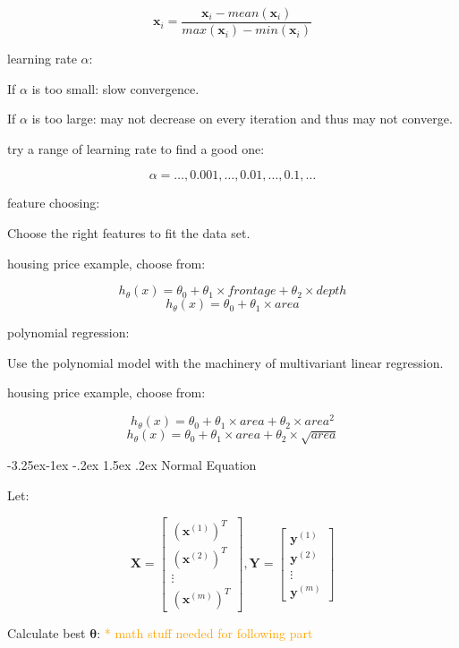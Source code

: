 \documentclass{article}
\makeatletter
\renewcommand\paragraph{\@startsection{paragraph}{4}{\z@}%
                                     {-3.25ex\@plus -1ex \@minus -.2ex}%
                                     {1.5ex \@plus .2ex}%
                                     {\normalfont\normalsize\bfseries}}
\makeatother
\begin{document}
\[\textbf{x}_i = \frac{\textbf{x}_i - mean(\textbf{x}_i)}{max(\textbf{x}_i) - min(\textbf{x}_i)}\]

\noindent learning rate \(\alpha\):

\noindent If \(\alpha\) is too small: slow convergence.

\noindent If \(\alpha\) is too large: may not decrease on every iteration and thus may not converge.

\noindent try a range of learning rate to find a good one:

\[\alpha = \dots, 0.001, \dots, 0.01, \dots, 0.1, \dots\]

\noindent feature choosing:

\noindent Choose the right features to fit the data set.

\noindent housing price example, choose from:

\[h_{\theta}(x) = \theta_0 + \theta_1 \times frontage + \theta_2 \times depth\]
\[h_{\theta}(x) = \theta_0 + \theta_1 \times area\]

\noindent polynomial regression:

\noindent Use the polynomial model with the machinery of multivariant linear regression.

\noindent housing price example, choose from:

\[h_{\theta}(x) = \theta_0 + \theta_1 \times area + \theta_2 \times area^2\]
\[h_{\theta}(x) = \theta_0 + \theta_1 \times area + \theta_2 \times \sqrt{area}\]

\paragraph{Normal Equation}

\noindent Let:

\[
\textbf{X} = 
\begin{bmatrix}
(\textbf{x}^{(1)})^T\\
(\textbf{x}^{(2)})^T\\
\vdots\\
(\textbf{x}^{(m)})^T
\end{bmatrix}
,
\textbf{Y} = 
\begin{bmatrix}
\textbf{y}^{(1)}\\
\textbf{y}^{(2)}\\
\vdots\\
\textbf{y}^{(m)}
\end{bmatrix}
\]

\noindent Calculate best \(\boldsymbol{\theta}\): \textcolor{orange}{ * math stuff needed for following part}
\end{document}

